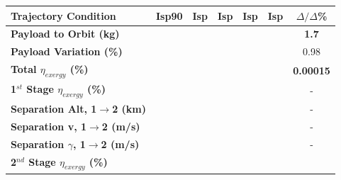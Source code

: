 \begin{table}[ht]
	\centering
\begin{tabular}{l c c c c c c} 
	\hline \textbf{Trajectory Condition}
	&Isp90
	&Isp
	&Isp
	&Isp
	&Isp
	& $\Delta/\Delta$\%
	\\
	\hline \textbf{Payload to Orbit (kg)}
	& \textbf{\PayloadToOrbitIspNinety}
	& \textbf{\PayloadToOrbitIspNinetyFive}
	& \textbf{\PayloadToOrbitIspStandard}
	& \textbf{\PayloadToOrbitIspOneHundredFive}
	& \textbf{\PayloadToOrbitIspOneHundredTen}
	&\textbf{1.7}
	\\
	\textbf{Payload Variation (\%)}
	& \PayloadVarIspNinety
	& \PayloadVarIspNinetyFive
	& \PayloadVarIspStandard
	& \PayloadVarIspOneHundredFive
	& \PayloadVarIspOneHundredTen
	&0.98
	\\
	\textbf{Total $\eta_{exergy}$ (\%)}
	& \textbf{\totalExergyEffIspNinety}
	& \textbf{\totalExergyEffIspNinetyFive}
	& \textbf{\totalExergyEffIspStandard}
	& \textbf{\totalExergyEffIspOneHundredFive}
	& \textbf{\totalExergyEffIspOneHundredTen}
	& \textbf{0.00015}
	\\
	\hline 
	\textbf{1$^{st}$ Stage $\eta_{exergy}$ (\%)}
	& \textbf{\firstExergyEffIspNinety}
	& \textbf{\firstExergyEffIspNinetyFive}
	& \textbf{\firstExergyEffIspStandard}
	& \textbf{\firstExergyEffIspOneHundredFive}
	& \textbf{\firstExergyEffIspOneHundredTen}
	& -
	\\
	\textbf{Separation Alt, 1$\rightarrow$2 (km)}
	& \firstsecondSeparationAltIspNinety
	& \firstsecondSeparationAltIspNinetyFive
	& \firstsecondSeparationAltIspStandard
	& \firstsecondSeparationAltIspOneHundredFive
	& \firstsecondSeparationAltIspOneHundredTen
	& -
	\\
	\textbf{Separation v, 1$\rightarrow$2 (m/s)}
	& \firstsecondSeparationvIspNinety
	& \firstsecondSeparationvIspNinetyFive
	& \firstsecondSeparationvIspStandard
	& \firstsecondSeparationvIspOneHundredFive
	& \firstsecondSeparationvIspOneHundredTen
	& -
	\\
	\textbf{Separation $\gamma$, 1$\rightarrow$2 (m/s)}
	& \firstsecondSeparationgammaIspNinety
	& \firstsecondSeparationgammaIspNinetyFive
	& \firstsecondSeparationgammaIspStandard
	& \firstsecondSeparationgammaIspOneHundredFive
	& \firstsecondSeparationgammaIspOneHundredTen
	& -
	\\
	\hline 
	\textbf{2$^{nd}$ Stage $\eta_{exergy}$ (\%)}
	& \textbf{\secondExergyEffIspNinety}
	& \textbf{\secondExergyEffIspNinetyFive}
	& \textbf{\secondExergyEffIspStandard}
	& \textbf{\secondExergyEffIspOneHundredFive}
	& \textbf{\secondExergyEffIspOneHundredTen}

\end{tabular}
\end{table}
